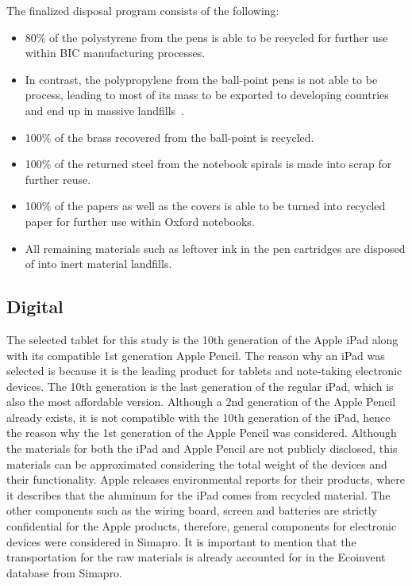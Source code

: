 The finalized disposal program consists of the following:
\begin{itemize}
    \item 80\% of the polystyrene from the pens is able to be recycled for further use within BIC manufacturing processes.
    \item In contrast, the polypropylene from the ball-point pens is not able to be process, leading to most of its mass to be exported to developing countries and end up in massive landfills~\cite{BICballpoint}.
    \item 100\% of the brass recovered from the ball-point is recycled.
    \item 100\% of the returned steel from the notebook spirals is made into scrap for further reuse.
    \item 100\% of the papers as well as the covers is able to be turned into recycled paper for further use within Oxford notebooks.
    \item All remaining materials such as leftover ink in the pen cartridges are disposed of into inert material landfills.
\end{itemize}

\subsection{Digital}\label{subsec:digital_scenario}
The selected tablet for this study is the 10th generation of the Apple iPad along with its compatible 1st generation Apple Pencil. The reason why an iPad was selected is because it is the leading product for tablets and note-taking electronic devices. The 10th generation is the last generation of the regular iPad, which is also the most affordable version. Although a 2nd generation of the Apple Pencil already exists, it is not compatible with the 10th generation of the iPad, hence the reason why the 1st generation of the Apple Pencil was considered. Although the materials for both the iPad and Apple Pencil are not publicly disclosed, this materials can be approximated considering the total weight of the devices and their functionality. Apple releases environmental reports for their products, where it describes that the aluminum for the iPad comes from recycled material. The other components such as the wiring board, screen and batteries are strictly confidential for the Apple products, therefore, general components for electronic devices were considered in Simapro. It is important to mention that the transportation for the raw materials is already accounted for in the Ecoinvent database from Simapro.
